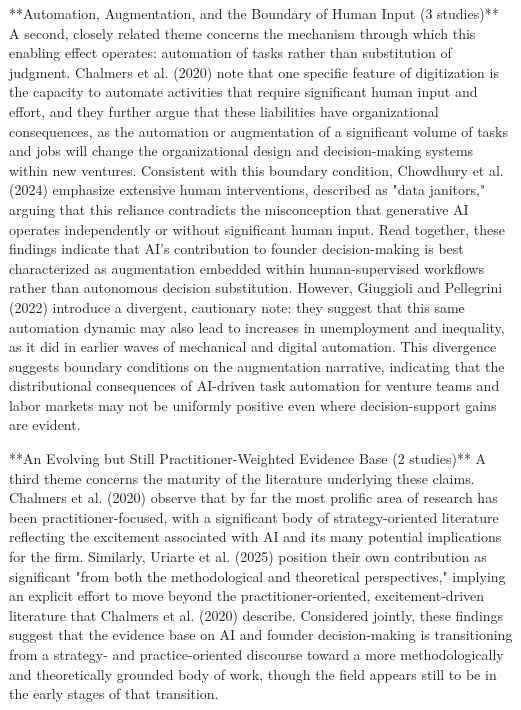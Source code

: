 \documentclass[11pt, a4paper]{article}
\begin{document}
**Automation, Augmentation, and the Boundary of Human Input (3 studies)**
A second, closely related theme concerns the mechanism through which this enabling effect operates: automation of tasks rather than substitution of judgment. Chalmers et al. (2020) note that one specific feature of digitization is the capacity to automate activities that require significant human input and effort, and they further argue that these liabilities have organizational consequences, as the automation or augmentation of a significant volume of tasks and jobs will change the organizational design and decision-making systems within new ventures. Consistent with this boundary condition, Chowdhury et al. (2024) emphasize extensive human interventions, described as "data janitors," arguing that this reliance contradicts the misconception that generative AI operates independently or without significant human input. Read together, these findings indicate that AI's contribution to founder decision-making is best characterized as augmentation embedded within human-supervised workflows rather than autonomous decision substitution. However, Giuggioli and Pellegrini (2022) introduce a divergent, cautionary note: they suggest that this same automation dynamic may also lead to increases in unemployment and inequality, as it did in earlier waves of mechanical and digital automation. This divergence suggests boundary conditions on the augmentation narrative, indicating that the distributional consequences of AI-driven task automation for venture teams and labor markets may not be uniformly positive even where decision-support gains are evident.

**An Evolving but Still Practitioner-Weighted Evidence Base (2 studies)**
A third theme concerns the maturity of the literature underlying these claims. Chalmers et al. (2020) observe that by far the most prolific area of research has been practitioner-focused, with a significant body of strategy-oriented literature reflecting the excitement associated with AI and its many potential implications for the firm. Similarly, Uriarte et al. (2025) position their own contribution as significant "from both the methodological and theoretical perspectives," implying an explicit effort to move beyond the practitioner-oriented, excitement-driven literature that Chalmers et al. (2020) describe. Considered jointly, these findings suggest that the evidence base on AI and founder decision-making is transitioning from a strategy- and practice-oriented discourse toward a more methodologically and theoretically grounded body of work, though the field appears still to be in the early stages of that transition.
\end{document}
